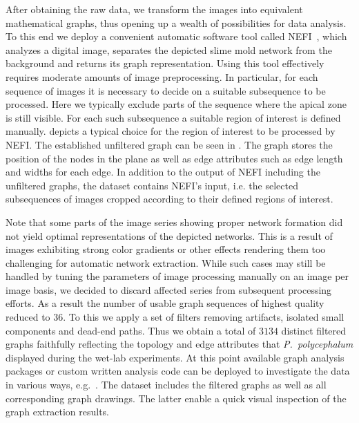 	After obtaining the raw data, we transform the images into equivalent mathematical graphs, thus opening up a wealth of possibilities for data analysis. To this end we deploy a convenient automatic software tool called NEFI~\cite{dirnberger2015nefi}, which analyzes a digital image, separates the depicted slime mold network from the background and returns its graph representation. Using this tool effectively requires moderate amounts of image preprocessing. In particular, for each sequence of images it is necessary to decide on a suitable subsequence to be processed. Here we typically exclude parts of the sequence where the apical zone is still visible. For each such subsequence a suitable region of interest is defined manually.  depicts a typical choice for the region of interest to be processed by NEFI. The established unfiltered graph can be seen in . The graph stores the position of the nodes in the plane as well as edge attributes such as edge length and widths for each edge. In addition to the output of NEFI including the unfiltered graphs, the dataset contains NEFI's input, i.e. the selected subsequences of images cropped according to their defined regions of interest.

	Note that some parts of the image series showing proper network formation did not yield optimal representations of the depicted networks. This is a result of images exhibiting strong color gradients or other effects rendering them too challenging for automatic network extraction. While such cases may still be handled by tuning the parameters of image processing manually on an image per image basis, we decided to discard affected series from subsequent processing efforts. As a result the number of usable graph sequences of highest quality reduced to $36$. To this we apply a set of filters removing artifacts, isolated small components and dead-end paths. Thus we obtain a total of $3134$ distinct filtered graphs faithfully reflecting the topology and edge attributes that \emph{P.~polycephalum} displayed during the wet-lab experiments. At this point available graph analysis packages or custom written analysis code can be deployed to investigate the data in various ways, e.g.~\cite{ICWSM09154,schult2008exploring}. The dataset includes the filtered graphs as well as all corresponding graph drawings. The latter enable a quick visual inspection of the graph extraction results.


